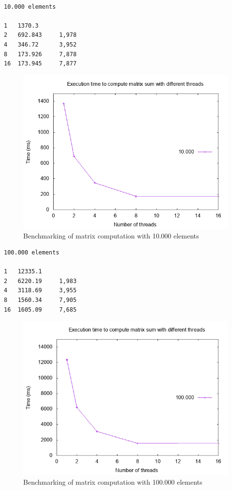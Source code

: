 \documentclass{article}
\begin{document}
\begin{verbatim}

10.000 elements

1   1370.3   
2   692.843     1,978
4   346.72      3,952   
8   173.926     7,878  
16  173.945     7,877
\end{verbatim}
\begin{figure}[h]
\centering
\includegraphics[scale=0.5]{Matrix - 10k.png}
\caption{Benchmarking of matrix computation with 10.000 elements}
\end{figure}      
\clearpage
\begin{verbatim}
100.000 elements

1   12335.1		       
2   6220.19     1,983       
4   3118.69     3,955      
8   1560.34     7,905       
16  1605.09     7,685      
\end{verbatim}

\begin{figure}[h]
\centering
\includegraphics[scale=0.5]{Matrix - 100k.png}
\caption{Benchmarking of matrix computation with 100.000 elements}
\end{figure}      
\clearpage
\end{document}
